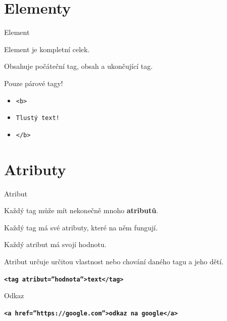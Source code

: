 \documentclass[aspectratio=1610]{beamer}
\begin{document}
\section{Elementy}
\begin{frame}{Element}
    \begin{cardTiny}
        Element je kompletní celek.

        Obsahuje počáteční tag, obsah a ukončující tag.

        Pouze párové tagy!
    \end{cardTiny}
    \begin{cardTiny}
        \begin{itemize}
        \item \texttt{<b>}
        \item \texttt{Tlustý text!}
        \item \texttt{</b>}
        \end{itemize}
    \end{cardTiny}
\end{frame}



\section{Atributy}
\begin{frame}{Atribut}
    \begin{cardTiny}
        Každý tag může mít nekonečně mnoho \textbf{atributů}.

        Každý tag má své atributy, které na něm fungují. 

        Každý atribut má svojí hodnotu.

        Atribut určuje určitou vlastnost nebo chování daného tagu a jeho dětí.
    \end{cardTiny}
    \begin{cardTiny}
        \begin{center}
        \texttt{\textbf{<tag atribut=''hodnota''>text</tag>}}
        \end{center}
    \end{cardTiny}
\end{frame}

\begin{frame}{Odkaz}
    \begin{cardTiny}
        \begin{center}
        \texttt{\textbf{<a href=''https://google.com''>odkaz na google</a>}}
        \end{center}
    \end{cardTiny}
\end{frame}
\end{document}
